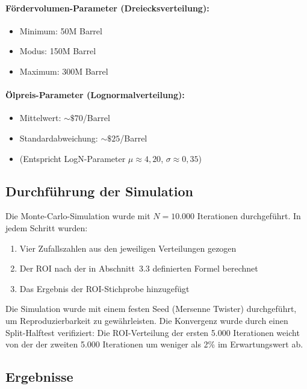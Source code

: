 \documentclass[12pt,a4paper]{article}
\begin{document}
\paragraph{Fördervolumen-Parameter (Dreiecksverteilung):}
\begin{itemize}[itemsep=1pt]
  \item Minimum: 50M Barrel
  \item Modus: 150M Barrel
  \item Maximum: 300M Barrel
\end{itemize}

\paragraph{Ölpreis-Parameter (Lognormalverteilung):}
\begin{itemize}[itemsep=1pt]
  \item Mittelwert: ${\sim}\$70$/Barrel
  \item Standardabweichung: ${\sim}\$25$/Barrel
  \item (Entspricht LogN-Parameter $\mu \approx 4{,}20$, $\sigma \approx 0{,}35$)
\end{itemize}

\subsection{Durchführung der Simulation}

Die Monte-Carlo-Simulation wurde mit $N = 10.000$ Iterationen durchgeführt. In jedem Schritt wurden:
\begin{enumerate}[label=\arabic*., itemsep=2pt]
  \item Vier Zufallszahlen aus den jeweiligen Verteilungen gezogen
  \item Der ROI nach der in Abschnitt~3.3 definierten Formel berechnet
  \item Das Ergebnis der ROI-Stichprobe hinzugefügt
\end{enumerate}

Die Simulation wurde mit einem festen Seed (Mersenne Twister) durchgeführt, um Reproduzierbarkeit zu gewährleisten. Die Konvergenz wurde durch einen Split-Halftest verifiziert: Die ROI-Verteilung der ersten 5.000 Iterationen weicht von der der zweiten 5.000 Iterationen um weniger als 2\% im Erwartungswert ab.

\subsection{Ergebnisse}
\end{document}
